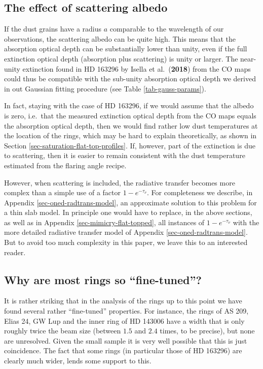 \documentclass{aa}
\def\paperdsharpisella{Isella et al.\ ({\bf 2018})}
\begin{document}
\subsection{The effect of scattering albedo}
If the dust grains have a radius $a$ comparable to the wavelength of our
observations, the scattering albedo can be quite high. This means that the
absorption optical depth can be substantially lower than unity, even if the full
extinction optical depth (absorption plus scattering) is unity or larger.  The
near-unity extinction found in HD 163296 by \paperdsharpisella{} from the CO
maps could thus be compatible with the sub-unity absorption optical depth we
derived in out Gaussian fitting procedure (see Table \ref{tab-gauss-params}).

In fact, staying with the case of HD 163296, if we would assume that the albedo
is zero, i.e.\ that the measured extinction optical depth from the CO maps
equals the absorption optical depth, then we would find rather low dust
temperatures at the location of the rings, which may be hard to explain
theoretically, as shown in Section \ref{sec-saturation-flat-top-profiles}.
If, however, part of the extinction is due to scattering, then it is easier
to remain consistent with the dust temperature estimated from the flaring
angle recipe.

However, when scattering is included, the radiative transfer becomes more
complex than a simple use of a factor $1-e^{-\tau_\nu}$. For completeness we
describe, in Appendix \ref{sec-oned-radtrans-model}, an approximate solution to
this problem for a thin slab model.  In principle one would have to replace, in
the above sections, as well as in Appendix \ref{sec-mimicry-flat-topped}, all
instances of $1-e^{-\tau_\nu}$ with the more detailed radiative transfer model
of Appendix \ref{sec-oned-radtrans-model}. But to avoid too much complexity in
this paper, we leave this to an interested reader.

\subsection{Why are most rings so ``fine-tuned''?}
It is rather striking that in the analysis of the rings up to this point we have
found several rather ``fine-tuned'' properties. For instance, the rings of AS
209, Elias 24, GW Lup and the inner ring of HD 143006 have a width that is only
roughly twice the beam size (between $1.5$ and $2.4$ times, to be precise), but
none are unresolved. Given the small sample it is very well possible that this
is just coincidence. The fact that some rings (in particular those of HD 163296)
are clearly much wider, lends some support to this.
\end{document}
